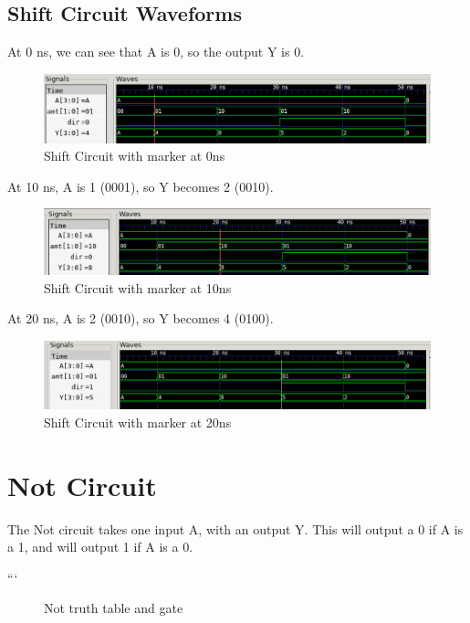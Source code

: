 \documentclass[12pt]{article}
\begin{document}
\subsection{Shift Circuit Waveforms}

At 0 ns, we can see that A is 0, so the output Y is 0.
\begin{figure}[H]
    \centering
    \includegraphics[width = 1.0\textwidth]{2x4Shifter/shift_wave.PNG}
    \caption{Shift Circuit with marker at 0ns}
    \label{fig:shift-wave1}
\end{figure}

At 10 ns, A is 1 (0001), so Y becomes 2 (0010).
\begin{figure}[H]
    \centering
    \includegraphics[width = 1.0\textwidth]{2x4Shifter/shift_wave1.PNG}
    \caption{Shift Circuit with marker at 10ns}
    \label{fig:shift-wave2}
\end{figure}

At 20 ns, A is 2 (0010), so Y becomes 4 (0100).
\begin{figure}[H]
    \centering
    \includegraphics[width = 1.0\textwidth]{2x4Shifter/shift_wave2.PNG}
    \caption{Shift Circuit with marker at 20ns}
    \label{fig:shift-wave3}
\end{figure}

\section{Not Circuit}
The Not circuit takes one input A, with an output Y. This will output a 0 if A is a 1, and will output 1 if A is a 0.

```\begin{figure}[H]
    \centering
    \caption{Not truth table and gate}
    \label{fig:shift-table}
\end{figure}
\end{document}
